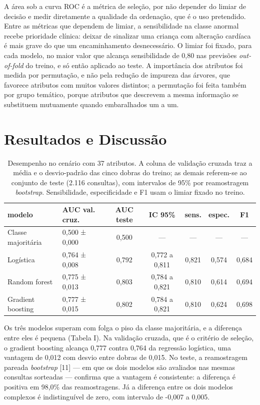 \documentclass[conference]{IEEEtran}
\begin{document}
A área sob a curva ROC é a métrica de seleção, por não depender do limiar de decisão e medir diretamente a qualidade da ordenação, que é o uso pretendido. Entre as métricas que dependem de limiar, a sensibilidade na classe anormal recebe prioridade clínica: deixar de sinalizar uma criança com alteração cardíaca é mais grave do que um encaminhamento desnecessário. O limiar foi fixado, para cada modelo, no maior valor que alcança sensibilidade de 0,80 nas previsões \textit{out-of-fold} do treino, e só então aplicado ao teste. A importância dos atributos foi medida por permutação, e não pela redução de impureza das árvores, que favorece atributos com muitos valores distintos; a permutação foi feita também por grupo temático, porque atributos que descrevem a mesma informação se substituem mutuamente quando embaralhados um a um.

\section{Resultados e Discussão}
\begin{table}[!t]
\caption{Desempenho no cenário com 37 atributos. A coluna de validação cruzada traz a média e o desvio-padrão das cinco dobras do treino; as demais referem-se ao conjunto de teste (2.116 consultas), com intervalos de 95\% por reamostragem \textit{bootstrap}. Sensibilidade, especificidade e F1 usam o limiar fixado no treino.}
\label{tab:tabela_comparativa}
\centering
\small
\begin{tabular}{llccccc}
\toprule
modelo & AUC val. cruz. & AUC teste & IC 95\% & sens. & espec. & F1 \\
\midrule
Classe majoritária & 0,500 ± 0,000 & 0,500 & --- & --- & --- & --- \\
Logística & 0,764 ± 0,008 & 0,792 & 0,772 a 0,811 & 0,821 & 0,574 & 0,684 \\
Random forest & 0,775 ± 0,013 & 0,803 & 0,784 a 0,821 & 0,810 & 0,614 & 0,694 \\
Gradient boosting & 0,777 ± 0,015 & 0,802 & 0,784 a 0,821 & 0,810 & 0,624 & 0,698 \\
\bottomrule
\end{tabular}
\end{table}
Os três modelos superam com folga o piso da classe majoritária, e a diferença entre eles é pequena (Tabela I). Na validação cruzada, que é o critério de seleção, o gradient boosting alcança 0,777 contra 0,764 da regressão logística, uma vantagem de 0,012 com desvio entre dobras de 0,015. No teste, a reamostragem pareada \textit{bootstrap} [11] --- em que os dois modelos são avaliados nas mesmas consultas sorteadas --- confirma que a vantagem é consistente: a diferença é positiva em 98,0\% das reamostragens. Já a diferença entre os dois modelos complexos é indistinguível de zero, com intervalo de -0,007 a 0,005.
\end{document}
